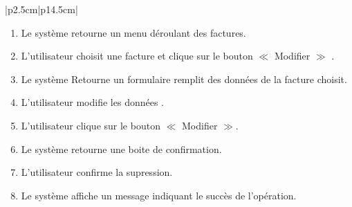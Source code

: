 \documentclass[11pt]{report}
\begin{document}
\begin{table}[h]
\begin{tabular}{|p{2.5cm}|p{14.5cm}|}
{\begin{enumerate}
      \item \begin{Large} Le système retourne un menu déroulant des factures.\end{Large}
      \item \begin{Large} L'utilisateur choisit une facture et clique sur le bouton $\ll$ Modifier $\gg$ .\end{Large}
      \item \begin{Large} Le système Retourne un formulaire remplit des données de la facture choisit. \end{Large}
      \item \begin{Large} L'utilisateur modifie les données .\end{Large}
      \item \begin{Large} L'utilisateur clique sur le bouton $\ll$ Modifier $\gg$.\end{Large}
      \item \begin{Large} Le système retourne une boite de confirmation.\end{Large}
      \item \begin{Large} L'utilisateur confirme la supression.\end{Large}
      \item \begin{Large} Le système affiche un message indiquant le succès de l'opération.\end{Large}
      
   \end{enumerate}} \\
   \hline
    \\
   \hline
    \\
   \hline
\end{tabular}
\caption{Description textuelle du cas d'utilisation $\ll$ Modifier une Facture $\gg$}
\end{table}
\end{document}
